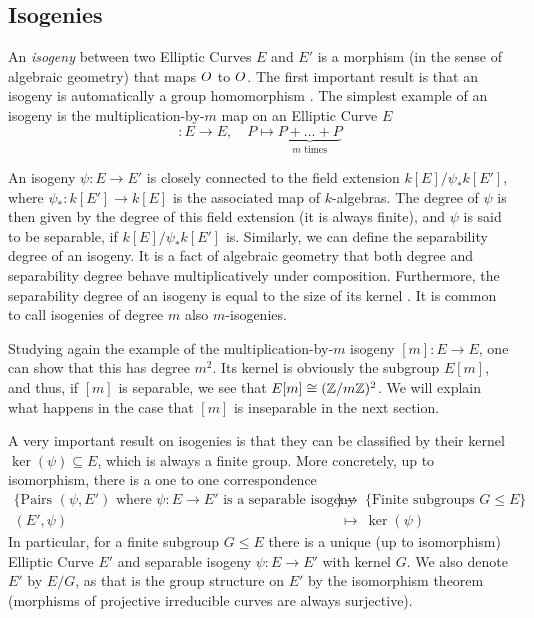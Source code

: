 \subsection{Isogenies}
An \emph{isogeny} between two Elliptic Curves $E$ and $E'$ is a morphism (in the sense of algebraic geometry) that maps $O$ to $O$.
The first important result is that an isogeny is automatically a group homomorphism \cite[Thm~III.4.8]{arithmetic_elliptic_curves}.
The simplest example of an isogeny is the multiplication-by-$m$ map on an Elliptic Curve $E$
\begin{equation*}
    [m]: E \to E, \quad P \mapsto \underbrace{P + ... + P}_{\text{$m$ times}}
\end{equation*}

An isogeny $\psi: E \to E'$ is closely connected to the field extension $k[E]/\psi_*k[E']$, where $\psi_*: k[E'] \to k[E]$ is the associated map of $k$-algebras.
The degree of $\psi$ is then given by the degree of this field extension (it is always finite), and $\psi$ is said to be separable, if $k[E]/\psi_*k[E']$ is.
Similarly, we can define the separability degree of an isogeny.
It is a fact of algebraic geometry that both degree and separability degree behave multiplicatively under composition.
Furthermore, the separability degree of an isogeny is equal to the size of its kernel \cite[Thm~III.4.10]{arithmetic_elliptic_curves}.
It is common to call isogenies of degree $m$ also $m$-isogenies.

Studying again the example of the multiplication-by-$m$ isogeny $[m]: E \to E$, one can show that this has degree $m^2$.
Its kernel is obviously the subgroup $E[m]$, and thus, if $[m]$ is separable, we see that $E[m] \cong (\mathbb{Z}/m\mathbb{Z})^2$.
We will explain what happens in the case that $[m]$ is inseparable in the next section.

A very important result on isogenies is that they can be classified by their kernel $\ker(\psi) \subseteq E$, which is always a finite group.
More concretely, up to isomorphism, there is a one to one correspondence
\begin{align*}
    \{ \text{Pairs $(\psi, E')$ where $\psi: E \to E'$ is a separable isogeny} \}  \ &\to \ \{ \text{Finite subgroups $G \leq E$} \} \\
    (E', \psi) \ &\mapsto \ \ker(\psi)
\end{align*}
In particular, for a finite subgroup $G \leq E$ there is a unique (up to isomorphism) Elliptic Curve $E'$ and separable isogeny $\psi: E \to E'$ with kernel $G$.
We also denote $E'$ by $E/G$, as that is the group structure on $E'$ by the isomorphism theorem (morphisms of projective irreducible curves are always surjective).

